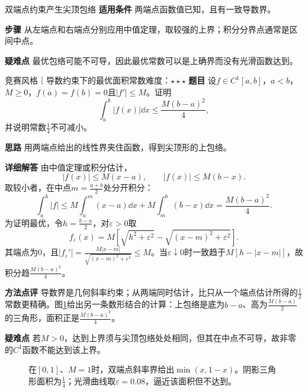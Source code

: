 \begin{method}{双端点约束产生尖顶包络}
\textbf{适用条件} 两端点函数值已知，且有一致导数界。\par
\textbf{步骤} 从左端点和右端点分别应用中值定理，取较强的上界；积分分界点通常是区间中点。\par
\textbf{疑难点} 最优包络可能不可导，因此最优常数可以是上确界而没有光滑函数达到。
\end{method}
\begin{example}{竞赛风格｜导数约束下的最优面积常数}{难度：$\star\star\star$}\label{ci:ex:tent}
\textbf{题目} 设$f\in C^1[a,b]$，$a<b$，$M\ge0$，$f(a)=f(b)=0$且$|f'|\le M$。证明
\[
 \int_a^b|f(x)|\dd x\le\dfrac{M(b-a)^2}4,
\]
并说明常数$\frac{1}{4}$不可减小。\par
\textbf{思路} 用两端点给出的线性界夹住函数，得到尖顶形的上包络。\par
\textbf{详细解答} 由中值定理或积分估计，
\[
 |f(x)|\le M(x-a),\qquad |f(x)|\le M(b-x).
\]
取较小者，在中点$m=\frac{a+b}{2}$处分开积分：
\[
 \int_a^b|f|\le
 M\int_a^m(x-a)\dd x+M\int_m^b(b-x)\dd x
 =\dfrac{M(b-a)^2}4.
\]
为证明最优，令$h=\frac{b-a}{2}$，对$\varepsilon>0$取
\[
 f_\varepsilon(x)=M\!\left[
 \sqrt{h^2+\varepsilon^2}-\sqrt{(x-m)^2+\varepsilon^2}\right].
\]
其端点为0，且$|f_\varepsilon'|=\frac{M|x-m|}{\sqrt{(x-m)^2+\varepsilon^2}}\le M$。当$\varepsilon\downarrow0$时一致趋于$M[h-|x-m|]$，故积分趋$\frac{M(b-a)^2}{4}$。\par
\textbf{方法点评} 导数界是几何斜率约束；从两端同时估计，比只从一个端点估计所得的$\frac{1}{2}$常数更精确。图\ref{ci:fig:tent}给出另一条数形结合的计算：上包络是底为$b-a$、高为$\frac{M(b-a)}{2}$的三角形，面积正是$\frac{M(b-a)^2}{4}$。\par
\textbf{疑难点} 若$M>0$，达到上界须与尖顶包络处处相同，但其在中点不可导，故非零的$C^1$函数不能达到该上界。
\end{example}
\begin{figure}[htbp]\centering
{}
\caption{在$[0,1]$、$M=1$时，双端点斜率界给出$\min(x,1-x)$。阴影三角形面积为$\frac{1}{4}$；光滑曲线取$\varepsilon=0.08$，逼近该面积但不达到。}\label{ci:fig:tent}
\end{figure}
